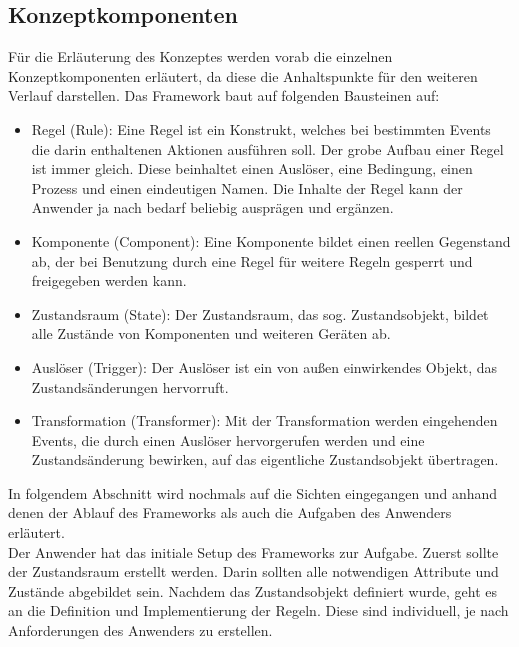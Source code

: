     \subsection{Konzeptkomponenten}
    \label{subsec:conceptcomps}
        Für die Erläuterung des Konzeptes werden vorab die einzelnen Konzeptkomponenten erläutert, da diese die Anhaltspunkte 
        für den weiteren Verlauf darstellen. Das Framework baut auf folgenden Bausteinen auf:
        \begin{itemize} 
            \item Regel (Rule): Eine Regel ist ein Konstrukt, welches bei bestimmten Events die darin enthaltenen Aktionen ausführen soll. 
            Der grobe Aufbau einer Regel ist immer gleich. Diese beinhaltet einen Auslöser, eine Bedingung, einen Prozess und einen eindeutigen 
            Namen. Die Inhalte der Regel kann der Anwender ja nach bedarf beliebig ausprägen und ergänzen. 
            \item Komponente (Component): Eine Komponente bildet einen reellen Gegenstand ab, der bei Benutzung durch eine Regel für weitere Regeln 
            gesperrt und freigegeben werden kann. 
            \item Zustandsraum (State): Der Zustandsraum, das sog. Zustandsobjekt, bildet alle Zustände von Komponenten und weiteren Geräten ab. 
            \item Auslöser (Trigger): Der Auslöser ist ein von außen einwirkendes Objekt, das Zustandsänderungen hervorruft.
            \item Transformation (Transformer): Mit der Transformation werden eingehenden Events, die durch einen Auslöser hervorgerufen 
            werden und eine Zustandsänderung bewirken, auf das eigentliche Zustandsobjekt übertragen. 
        \end{itemize}
        In folgendem Abschnitt wird nochmals auf die Sichten eingegangen und anhand denen der Ablauf des Frameworks als auch die 
        Aufgaben des Anwenders erläutert. %
        \\
        \linebreak
        Der Anwender hat das initiale Setup des Frameworks zur Aufgabe. Zuerst sollte der Zustandsraum erstellt werden. 
        Darin sollten alle notwendigen Attribute und Zustände abgebildet sein. Nachdem das Zustandsobjekt definiert wurde, geht 
        es an die Definition und Implementierung der Regeln. Diese sind individuell, je nach Anforderungen des Anwenders zu erstellen. 
